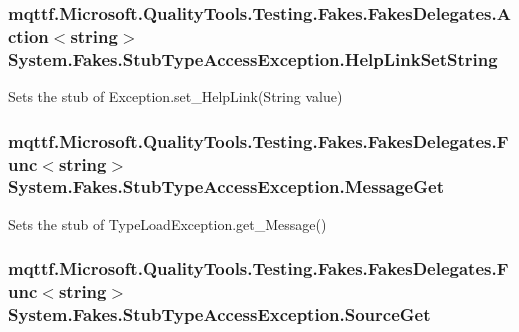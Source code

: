 \hypertarget{class_system_1_1_fakes_1_1_stub_type_access_exception_af7c1720f46df3f4f5c95d829d5d5be4c}{
\subsubsection[{Help\-Link\-Set\-String}]{\setlength{\rightskip}{0pt plus 5cm}mqttf.\-Microsoft.\-Quality\-Tools.\-Testing.\-Fakes.\-Fakes\-Delegates.\-Action$<$string$>$ System.\-Fakes.\-Stub\-Type\-Access\-Exception.\-Help\-Link\-Set\-String}}\label{class_system_1_1_fakes_1_1_stub_type_access_exception_af7c1720f46df3f4f5c95d829d5d5be4c}


Sets the stub of Exception.\-set\-\_\-\-Help\-Link(\-String value)

\hypertarget{class_system_1_1_fakes_1_1_stub_type_access_exception_a8883b96bfe193d0b34e188a4845102b7}{
\subsubsection[{Message\-Get}]{\setlength{\rightskip}{0pt plus 5cm}mqttf.\-Microsoft.\-Quality\-Tools.\-Testing.\-Fakes.\-Fakes\-Delegates.\-Func$<$string$>$ System.\-Fakes.\-Stub\-Type\-Access\-Exception.\-Message\-Get}}\label{class_system_1_1_fakes_1_1_stub_type_access_exception_a8883b96bfe193d0b34e188a4845102b7}


Sets the stub of Type\-Load\-Exception.\-get\-\_\-\-Message()

\hypertarget{class_system_1_1_fakes_1_1_stub_type_access_exception_aaa81eea9980439095eef1be2d553d32a}{
\subsubsection[{Source\-Get}]{\setlength{\rightskip}{0pt plus 5cm}mqttf.\-Microsoft.\-Quality\-Tools.\-Testing.\-Fakes.\-Fakes\-Delegates.\-Func$<$string$>$ System.\-Fakes.\-Stub\-Type\-Access\-Exception.\-Source\-Get}}\label{class_system_1_1_fakes_1_1_stub_type_access_exception_aaa81eea9980439095eef1be2d553d32a}


